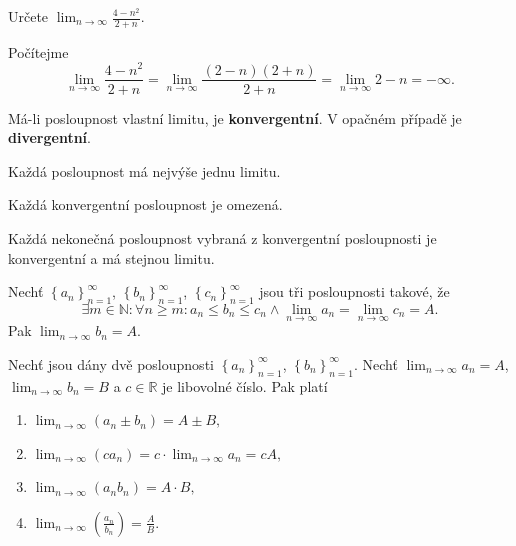 \begin{priklad}
Určete $\lim_{n\to \infty}\frac{4-n^2}{2+n}.$
\end{priklad}

\begin{reseni}
Počítejme
$$
\lim_{n \to \infty} \frac{4-n^2}{2+n} = \lim_{n \to \infty} \frac{(2-n)(2+n)}{2+n} = \lim_{n \to \infty} 2-n = -\infty.
$$
\end{reseni}

\begin{definition}
    Má-li posloupnost vlastní limitu, je \textbf{konvergentní}. V opačném
    případě je \textbf{divergentní}.
\end{definition}

\begin{veta}
    Každá posloupnost má nejvýše jednu limitu.
\end{veta}

\begin{veta}
    Každá konvergentní posloupnost je omezená.
\end{veta}

\begin{veta}
    Každá nekonečná posloupnost vybraná z konvergentní posloupnosti
    je konvergentní a má stejnou limitu.
\end{veta}

\begin{veta}
    Nechť $\left \{ a_n \right \}_{n=1}^\infty $, $\left \{ b_n \right \}_{n=1}^\infty $,
    $\left \{ c_n \right \}_{n=1}^\infty $ jsou tři posloupnosti takové, že
    $$\exists m\in \mathbb N\colon \forall n \geq m\colon a_n \leq b_n \leq c_n \land \lim_{n\to \infty}a_n=\lim_{n\to \infty}c_n=A.$$
    Pak $\lim_{n\to\infty}b_n=A.$
\end{veta}

\begin{veta}
Nechť jsou dány dvě posloupnosti $\left \{ a_n \right \}_{n=1}^\infty $, $\left \{ b_n \right \}_{n=1}^\infty$. Nechť $\lim_{n\to \infty}a_n = A$, $\lim_{n\to \infty}b_n = B$
a $c\in \mathbb R$ je libovolné číslo. Pak platí
\begin{enumerate}[$i.$]
\item $\lim_{n\to \infty}\left ( a_n\pm b_n \right ) =A\pm B,$
\item $\lim_{n\to\infty}\left ( ca_n \right ) =c\cdot \lim_{n\to\infty}a_n=cA,$
\item $\lim_{n\to\infty}\left ( a_nb_n \right )=A\cdot B, $
\item $\lim_{n\to\infty}\left ( \frac{a_n}{b_n} \right ) =\frac{A}{B}.$
\end{enumerate}
\end{veta}

